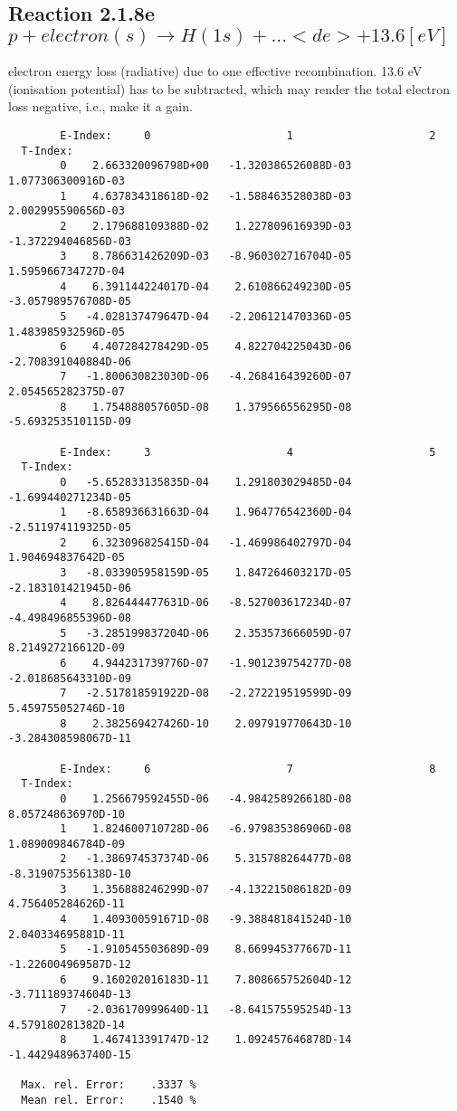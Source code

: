 \subsection{
  Reaction 2.1.8e  $p + electron(s) \rightarrow H(1s) + ...   <de>+13.6 [eV] $
}

  electron energy loss (radiative) due to one effective recombination.
  13.6 eV (ionisation potential) has to be
  subtracted, which may render the total electron loss negative, i.e., make it a gain.

\begin{verbatim}
        E-Index:     0                     1                     2
  T-Index:
        0    2.663320096798D+00   -1.320386526088D-03    1.077306300916D-03
        1    4.637834318618D-02   -1.588463528038D-03    2.002995590656D-03
        2    2.179688109388D-02    1.227809616939D-03   -1.372294046856D-03
        3    8.786631426209D-03   -8.960302716704D-05    1.595966734727D-04
        4    6.391144224017D-04    2.610866249230D-05   -3.057989576708D-05
        5   -4.028137479647D-04   -2.206121470336D-05    1.483985932596D-05
        6    4.407284278429D-05    4.822704225043D-06   -2.708391040884D-06
        7   -1.800630823030D-06   -4.268416439260D-07    2.054565282375D-07
        8    1.754888057605D-08    1.379566556295D-08   -5.693253510115D-09

        E-Index:     3                     4                     5
  T-Index:
        0   -5.652833135835D-04    1.291803029485D-04   -1.699440271234D-05
        1   -8.658936631663D-04    1.964776542360D-04   -2.511974119325D-05
        2    6.323096825415D-04   -1.469986402797D-04    1.904694837642D-05
        3   -8.033905958159D-05    1.847264603217D-05   -2.183101421945D-06
        4    8.826444477631D-06   -8.527003617234D-07   -4.498496855396D-08
        5   -3.285199837204D-06    2.353573666059D-07    8.214927216612D-09
        6    4.944231739776D-07   -1.901239754277D-08   -2.018685643310D-09
        7   -2.517818591922D-08   -2.272219519599D-09    5.459755052746D-10
        8    2.382569427426D-10    2.097919770643D-10   -3.284308598067D-11

        E-Index:     6                     7                     8
  T-Index:
        0    1.256679592455D-06   -4.984258926618D-08    8.057248636970D-10
        1    1.824600710728D-06   -6.979835386906D-08    1.089009846784D-09
        2   -1.386974537374D-06    5.315788264477D-08   -8.319075356138D-10
        3    1.356888246299D-07   -4.132215086182D-09    4.756405284626D-11
        4    1.409300591671D-08   -9.388481841524D-10    2.040334695881D-11
        5   -1.910545503689D-09    8.669945377667D-11   -1.226004969587D-12
        6    9.160202016183D-11    7.808665752604D-12   -3.711189374604D-13
        7   -2.036170999640D-11   -8.641575595254D-13    4.579180281382D-14
        8    1.467413391747D-12    1.092457646878D-14   -1.442948963740D-15

  Max. rel. Error:    .3337 %
  Mean rel. Error:    .1540 %

\end{verbatim}
